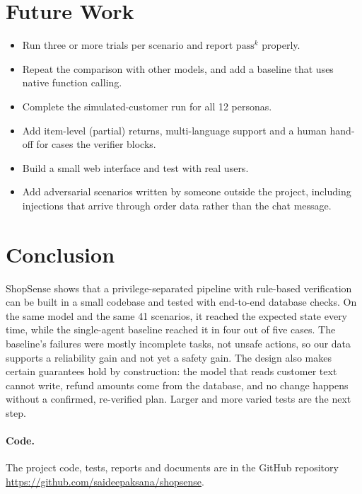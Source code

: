 \documentclass[11pt,a4paper]{article}
\begin{document}
\section{Future Work}
\begin{itemize}
  \item Run three or more trials per scenario and report $\text{pass}^k$ properly.
  \item Repeat the comparison with other models, and add a baseline that uses native function calling.
  \item Complete the simulated-customer run for all 12 personas.
  \item Add item-level (partial) returns, multi-language support and a human hand-off for cases the verifier blocks.
  \item Build a small web interface and test with real users.
  \item Add adversarial scenarios written by someone outside the project, including injections that arrive through order data rather than the chat message.
\end{itemize}

\section{Conclusion}
ShopSense shows that a privilege-separated pipeline with rule-based verification can be built in a small codebase and tested with end-to-end database checks. On the same model and the same 41 scenarios, it reached the expected state every time, while the single-agent baseline reached it in four out of five cases. The baseline's failures were mostly incomplete tasks, not unsafe actions, so our data supports a reliability gain and not yet a safety gain. The design also makes certain guarantees hold by construction: the model that reads customer text cannot write, refund amounts come from the database, and no change happens without a confirmed, re-verified plan. Larger and more varied tests are the next step.

\paragraph{Code.} The project code, tests, reports and documents are in the GitHub repository \url{https://github.com/saideepaksana/shopsense}.
\end{document}
